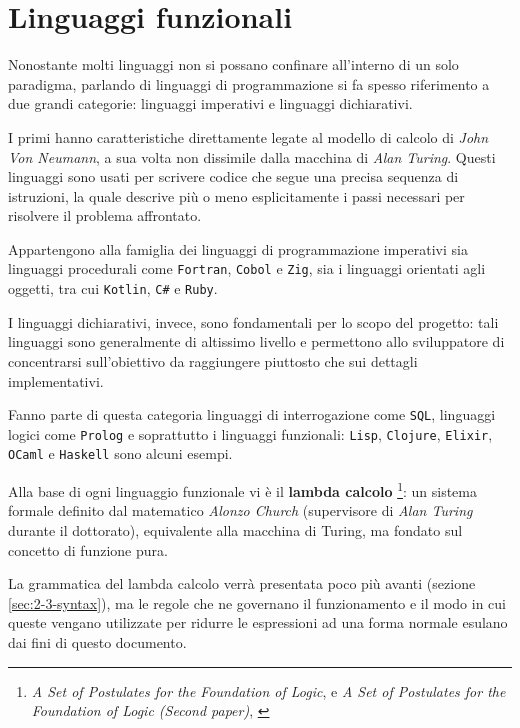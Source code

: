 \section{Linguaggi funzionali}
\label{sec:2-1-functional-languages}

Nonostante molti linguaggi non si possano confinare all'interno di un solo paradigma,
parlando di linguaggi di programmazione si fa spesso riferimento a due grandi categorie:
linguaggi imperativi e linguaggi dichiarativi.


I primi hanno caratteristiche direttamente legate al modello di calcolo di \textit{John Von Neumann},
a sua volta non dissimile dalla macchina di \textit{Alan Turing}.
Questi linguaggi sono usati per scrivere codice che segue una precisa sequenza di istruzioni,
la quale descrive più o meno esplicitamente i passi necessari per risolvere il problema affrontato.

\noindent Appartengono alla famiglia dei linguaggi di programmazione imperativi sia linguaggi procedurali come
\texttt{Fortran}, \texttt{Cobol} e \texttt{Zig}, sia i linguaggi orientati agli oggetti, tra cui \texttt{Kotlin}, \texttt{C\#} e \texttt{Ruby}.


I linguaggi dichiarativi, invece, sono fondamentali per lo scopo del progetto:
tali linguaggi sono generalmente di altissimo livello e permettono allo sviluppatore
di concentrarsi sull'obiettivo da raggiungere piuttosto che sui dettagli implementativi.

\noindent Fanno parte di questa categoria linguaggi di interrogazione come \texttt{SQL},
linguaggi logici come \texttt{Prolog} e soprattutto i linguaggi funzionali:
\texttt{Lisp}, \texttt{Clojure}, \texttt{Elixir}, \texttt{OCaml} e \texttt{Haskell} sono alcuni esempi.


Alla base di ogni linguaggio funzionale vi è il \textbf{lambda calcolo}%
\footnote{\textit{A Set of Postulates for the Foundation of Logic}, \cite{PostulatesFoundationLogic1}
      e \textit{A Set of Postulates for the Foundation of Logic (Second paper)}, \cite{PostulatesFoundationLogic2}}:
un sistema formale definito dal matematico \textit{Alonzo Church} (supervisore di \textit{Alan Turing} durante il dottorato),
equivalente alla macchina di Turing, ma fondato sul concetto di funzione pura.

\newpage

\noindent La grammatica del lambda calcolo verrà presentata poco più avanti (sezione \ref{sec:2-3-syntax}),
ma le regole che ne governano il funzionamento e il modo in cui queste vengano utilizzate per ridurre
le espressioni ad una forma normale esulano dai fini di questo documento.

